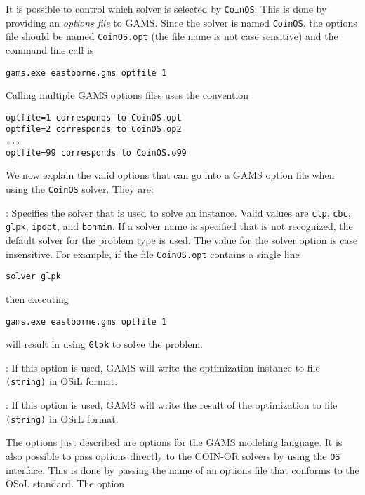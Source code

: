 It is possible to control which solver is selected by {\tt CoinOS}.    This is done by providing an {\it options file}  to  GAMS.   
Since the solver is named {\tt  CoinOS}, the options file should  be named {\tt CoinOS.opt}  (the file name is not case sensitive)
and the command line call is 
\begin{verbatim}
gams.exe eastborne.gms optfile 1
\end{verbatim}
Calling multiple GAMS options files uses the convention
\begin{verbatim}
optfile=1 corresponds to CoinOS.opt
optfile=2 corresponds to CoinOS.op2
...
optfile=99 corresponds to CoinOS.o99
\end{verbatim}

We now explain the valid options that can go into a GAMS option file when using the {\tt CoinOS} solver.  They are:

\vskip 8pt
:   Specifies the solver that is used to solve an instance. 
Valid values are {\tt clp},  {\tt cbc}, {\tt glpk}, {\tt ipopt},  and {\tt bonmin}.  
If a solver name is specified that is not recognized, the default solver for the problem type is used.  
The value for the solver option is case insensitive. 
For example, if the file {\tt CoinOS.opt} contains a single line
\begin{verbatim}
solver glpk
\end{verbatim}
then executing
\begin{verbatim}
gams.exe eastborne.gms optfile 1
\end{verbatim}
will result in  using {\tt Glpk}  to solve the problem.   


\vskip 8pt
:  If this option is used, GAMS will write the optimization instance 
to file {\tt (string)} in    OSiL   format.
\vskip 8pt

\vskip 8pt
:  If this option is used, GAMS will write the result of the optimization 
to file {\tt (string)} in OSrL  format.
\vskip 8pt

The options just described are options for the GAMS modeling language.  
It is also possible to pass options directly to the COIN-OR solvers by using the {\tt OS} interface.
This is done by passing the name of an options file that conforms to the  OSoL  standard.  
The option

